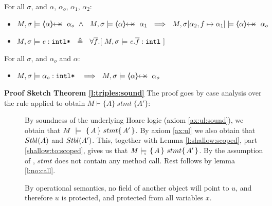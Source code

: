 {{
 \begin{lemma} For all $\sigma$,  and $\alpha$, $\alpha_o$, $\alpha_1$, $\alpha_2$:
 \label{l:prtFrom}
\begin{itemize}
\item
$ M, \sigma  \models    {\protectedFrom \alpha  {\alpha_o}}  \  \wedge \ \  M, \sigma  \models    {\protectedFrom \alpha  {\alpha_1}}    \   \ 
\Longrightarrow\ \ M, \sigma[\alpha_2,f \mapsto \alpha_1] \models  \protectedFrom\alpha   {\alpha_o}$
\end{itemize}
\end{lemma}
}

{
\begin{definition}
\begin{itemize}
\item
$M, \sigma \models \mathit{e}:\mbox{\normalfont{\texttt{intl*}}} \ \ \triangleq \ \ \forall \overline{f}.[\  M, \sigma \models \mathit{e}.\overline{f}:\mbox{\normalfont{\texttt{intl}}}\ ]$
\end{itemize}
\end{definition}
}

{
 \begin{lemma} For all $\sigma$, and $\alpha_o$ and $\alpha$:
\begin{itemize}
\item
$M, \sigma \models \internalPaths{\alpha_o}  \    \ \ \Longrightarrow\ \ M, \sigma \models {\protectedFrom \alpha {\alpha_o}}$
\end{itemize}
\end{lemma}
}

\noindent
\vspace{.2cm}
 {\textbf{Proof Sketch Theorem \ref{l:triples:sound}} 
The proof goes by case analysis over the rule applied to obtain $M \vdash \{ A \}\ stmt \  \{ A' \} $:

\begin{description} 

\item[{}] 
By  soundness of the underlying Hoare logic (axiom \ref{ax:ul:sound}), we obtain that  $M\ \models\  \{\, A \, \}\ stmt \{\, A' \, \}$.
By axiom \ref{ax:ul} we also obtain that ${Stbl( A )}$ and  ${Stbl( A' )}$. 
This, together with   Lemma \ref{l:shallow:scoped}, part \ref{shallow:to:scoped}, gives us that
$M \models\!\!\!\!_{_{\circ}}\   \{\, A \, \}\ stmt \{\, A' \, \}  $. 
By the assumption of {}, $stmt$ does not contain any method call. Rest follows by lemma \ref{l:no:call}.

\item[{}] By operational semantics, no field of another object will point to $u$, and therefore $u$ is protected, and protected from all variables $x$.


\end{description}}}
